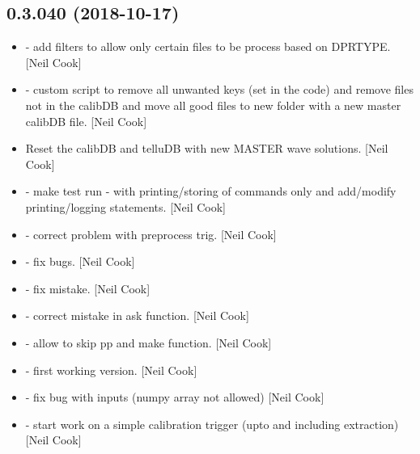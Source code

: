 \documentclass[a4paper,10pt,english]{report}
\begin{document}
\subsection{0.3.040 (2018-10-17)}
\label{\detokenize{misc/changelog:id289}}\begin{itemize}
\item {} 
 - add filters to allow only certain files to be
process based on DPRTYPE. {[}Neil Cook{]}

\item {} 
 - custom script to remove all unwanted keys (set in the
code) and remove files not in the calibDB and move all good files to
new folder with a new master calibDB file. {[}Neil Cook{]}

\item {} 
Reset the calibDB and telluDB with new MASTER wave solutions. {[}Neil
Cook{]}

\item {} 
 - make test run - with printing/storing of commands
only and add/modify printing/logging statements. {[}Neil Cook{]}

\item {} 
 - correct problem with preprocess trig. {[}Neil Cook{]}

\item {} 
 - fix bugs. {[}Neil Cook{]}

\item {} 
 - fix mistake. {[}Neil Cook{]}

\item {} 
 - correct mistake in ask function. {[}Neil Cook{]}

\item {} 
 - allow to skip pp and make function. {[}Neil Cook{]}

\item {} 
 - first working version. {[}Neil Cook{]}

\item {} 
 - fix bug with inputs (numpy array not allowed) {[}Neil
Cook{]}

\item {} 
 - start work on a simple calibration trigger (upto
and including extraction) {[}Neil Cook{]}

\end{itemize}
\end{document}
